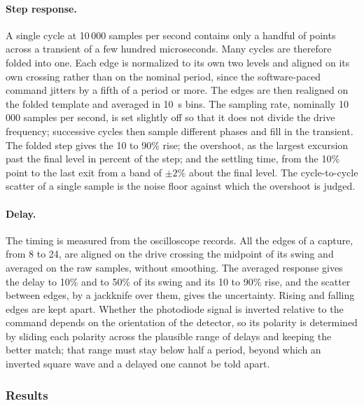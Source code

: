 \documentclass{article}
\begin{document}
\paragraph{Step response.}
A single cycle at 10\,000 samples per second contains only a handful of points across a transient of
a few hundred microseconds. Many cycles are therefore folded into one. Each edge is normalized to its
own two levels and aligned on its own crossing rather than on the nominal period, since the
software-paced command jitters by a fifth of a period or more. The edges are then realigned on the
folded template and averaged in 10~\textmu s bins. The sampling rate, nominally 10\,000 samples
per second, is set slightly off so that it does not divide the drive frequency; successive cycles
then sample different phases and fill in the transient. The
folded step gives the 10 to 90\% rise; the overshoot, as the largest excursion past the final level
in percent of the step; and the settling time, from the 10\% point to the last exit from a band of
$\pm2\%$ about the final level. The cycle-to-cycle scatter of a single sample is the noise floor
against which the overshoot is judged.

\paragraph{Delay.}
The timing is measured from the oscilloscope records. All the edges of a capture, from 8 to 24,
are aligned on the drive crossing the midpoint of its swing and averaged on the raw samples, without
smoothing. The averaged response gives the delay to 10\% and to 50\% of its swing and its 10 to
90\% rise, and the scatter between edges, by a jackknife over them, gives the uncertainty. Rising
and falling edges are kept apart. Whether the photodiode signal is inverted relative to the
command depends on the orientation of the detector, so its polarity is determined by sliding each polarity across the plausible range of delays and
keeping the better match; that range must stay below half a period, beyond which an inverted square
wave and a delayed one cannot be told apart.

\subsubsection{Results}
\end{document}
